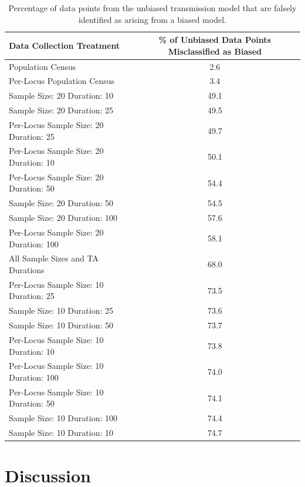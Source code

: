 \begin{table}[ht]

\begin{tabular}{|l|c|}
  \hline
Data Collection Treatment & \% of Unbiased Data Points Misclassified as Biased \\
  \hline
Population Census & 2.6 \\
  Per-Locus Population Census & 3.4 \\
  Sample Size:  20  Duration:  10 & 49.1 \\
  Sample Size:  20  Duration:  25 & 49.5 \\
  Per-Locus Sample Size:  20  Duration:  25 & 49.7 \\
  Per-Locus Sample Size:  20  Duration:  10 & 50.1 \\
  Per-Locus Sample Size:  20  Duration:  50 & 54.4 \\
  Sample Size:  20  Duration:  50 & 54.5 \\
  Sample Size:  20  Duration:  100 & 57.6 \\
  Per-Locus Sample Size:  20  Duration:  100 & 58.1 \\
  All Sample Sizes and TA Durations & 68.0 \\
  Per-Locus Sample Size:  10  Duration:  25 & 73.5 \\
  Sample Size:  10  Duration:  25 & 73.6 \\
  Sample Size:  10  Duration:  50 & 73.7 \\
  Per-Locus Sample Size:  10  Duration:  10 & 73.8 \\
  Per-Locus Sample Size:  10  Duration:  100 & 74.0 \\
  Per-Locus Sample Size:  10  Duration:  50 & 74.1 \\
  Sample Size:  10  Duration:  100 & 74.4 \\
  Sample Size:  10  Duration:  10 & 74.7 \\
   \hline
\end{tabular}

    \caption{Percentage of data points from the unbiased transmission model that are falsely identified as arising from a biased model.}
    \label{ctmixtures:tab:misclassification-neutral}
\end{table}


\section{Discussion}\label{ctmixtures:sec:conclusion}

